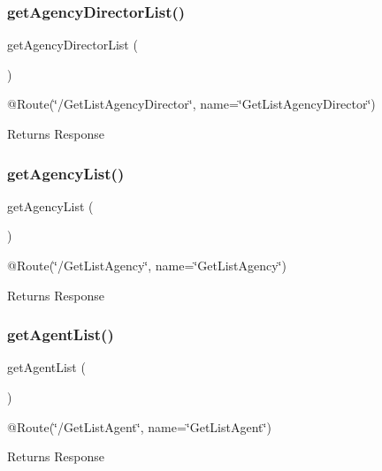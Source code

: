 \subsubsection{\texorpdfstring{getAgencyDirectorList()}{getAgencyDirectorList()}}
{\footnotesize\ttfamily get\+Agency\+Director\+List (\begin{DoxyParamCaption}{ }\end{DoxyParamCaption})}

@\+Route(\char`\"{}/\+Get\+List\+Agency\+Director\char`\"{}, name=\char`\"{}\+Get\+List\+Agency\+Director\char`\"{}) \begin{DoxyReturn}{Returns}
Response 
\end{DoxyReturn}
\mbox{\label{class_app_1_1_controller_1_1_back_office_controller_a15ba718fd7d047b203a9f0fde6849710}} 
\subsubsection{\texorpdfstring{getAgencyList()}{getAgencyList()}}
{\footnotesize\ttfamily get\+Agency\+List (\begin{DoxyParamCaption}{ }\end{DoxyParamCaption})}

@\+Route(\char`\"{}/\+Get\+List\+Agency\char`\"{}, name=\char`\"{}\+Get\+List\+Agency\char`\"{}) \begin{DoxyReturn}{Returns}
Response 
\end{DoxyReturn}
\mbox{\label{class_app_1_1_controller_1_1_back_office_controller_a5cd69991d5f4d0002a9a8002367734a4}} 
\subsubsection{\texorpdfstring{getAgentList()}{getAgentList()}}
{\footnotesize\ttfamily get\+Agent\+List (\begin{DoxyParamCaption}{ }\end{DoxyParamCaption})}

@\+Route(\char`\"{}/\+Get\+List\+Agent\char`\"{}, name=\char`\"{}\+Get\+List\+Agent\char`\"{}) \begin{DoxyReturn}{Returns}
Response 
\end{DoxyReturn}
\mbox{\label{class_app_1_1_controller_1_1_back_office_controller_aaff2f32ce95b0fc779c6bf0a4cb951de}} 
